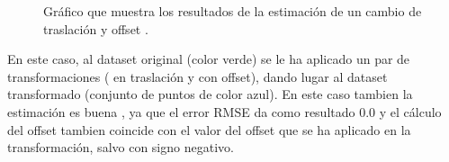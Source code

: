 \begin{figure}[H]
\begin{center}
\hspace{0.5cm}

\end{center}

\caption{Gráfico que muestra los resultados de la estimación de un cambio de traslación y offset .}
\end{figure}
En este caso, al dataset original (color verde) se le ha aplicado un par de transformaciones ( en traslación y con offset), dando lugar al dataset transformado (conjunto de puntos de color azul). En este caso tambien la estimación es buena , ya que el error RMSE da como resultado 0.0 y el cálculo del offset tambien coincide con el valor del offset que se ha aplicado en la transformación, salvo con signo negativo.


